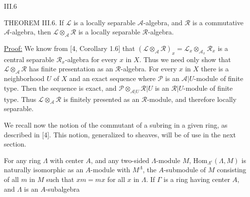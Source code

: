 III.6

THEOREM III.6. If $\mathcal{L}$ is a locally separable $\mathcal{A}$-algebra, and $\mathcal{R}$ is a commutative $\mathcal{A}$-algebra, then $\mathcal{L}\otimes_{\mathcal{A}}\mathcal{R}$ is a locally separable $\mathcal{R}$-algebra.

\uline{Proof:} We know from [4, Corollary 1.6] that $(\mathcal{L}\otimes_{\mathcal{A}}\mathcal{R})_x=\mathcal{L}_x\otimes_{\mathcal{A}_x}\mathcal{R}_x$ is a central separable $\mathcal{R}_x$-algebra for every $x$ in $X$.
Thus we need only show that $\mathcal{L}\otimes_{\mathcal{A}}\mathcal{R}$ has finite presentation as an $\mathcal{R}$-algebra. For every $x$ in $X$ there is a neighborhood $U$ of $X$ and an exact sequence
where $\mathcal{P}$ is an $\mathcal{A}|U$-module of finite type. Then the sequence
is exact, and $\mathcal{P}\otimes_{\mathcal{A}|U}\mathcal{R}|U$ is an $\mathcal{R}|U$-module of finite type. Thus $\mathcal{L}\otimes_{\mathcal{A}}\mathcal{R}$ is finitely presented as an $\mathcal{R}$-module, and therefore locally separable.

We recall now the notion of the commutant of a subring in a given ring, as described in [4]. This notion, generalized to sheaves, will be of use in the next section.

For any ring $\Lambda$ with center $A$, and any two-sided $\Lambda$-module $M$, $\mathrm{Hom}_{\Lambda^e}(\Lambda,M)$ is naturally isomorphic as an $A$-module with $M^\Lambda$, the $A$-submodule of $M$ consisting of all $m$ in $M$ such that $xm=mx$ for all $x$ in $\Lambda$. If $\Gamma$ is a ring having center $A$, and $\Lambda$ is an $A$-subalgebra

